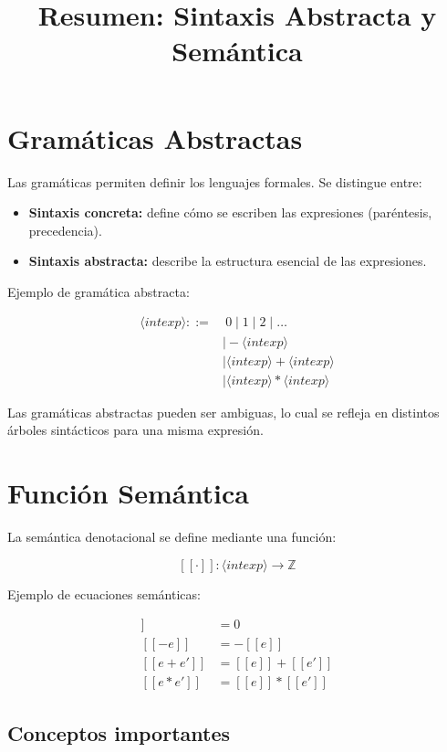 \documentclass[a4paper,12pt]{article}
\title{Resumen: Sintaxis Abstracta y Semántica}
\author{}
\date{}
\begin{document}
\maketitle

\section{Gramáticas Abstractas}

Las gramáticas permiten definir los lenguajes formales. Se distingue entre:

\begin{itemize}
    \item \textbf{Sintaxis concreta:} define cómo se escriben las expresiones (paréntesis, precedencia).
    \item \textbf{Sintaxis abstracta:} describe la estructura esencial de las expresiones.
\end{itemize}

Ejemplo de gramática abstracta:

\begin{align*}
\langle intexp \rangle ::= &\ 0 \mid 1 \mid 2 \mid \dots \\
&\mid -\langle intexp \rangle \\
&\mid \langle intexp \rangle + \langle intexp \rangle \\
&\mid \langle intexp \rangle * \langle intexp \rangle
\end{align*}

Las gramáticas abstractas pueden ser ambiguas, lo cual se refleja en distintos árboles sintácticos para una misma expresión.

\section{Función Semántica}

La semántica denotacional se define mediante una función:

\[
[[\cdot]] : \langle intexp \rangle \rightarrow \mathbb{Z}
\]

Ejemplo de ecuaciones semánticas:

\begin{align*}
[[0]] &= 0 \\
[[ -e ]] &= -[[e]] \\
[[ e + e']] &= [[e]] + [[e']] \\
[[ e * e']] &= [[e]] * [[e']]
\end{align*}

\subsection{Conceptos importantes}
\end{document}
